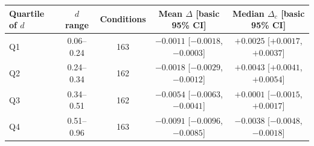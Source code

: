 \begin{tabular}{lcccc}
\toprule
Quartile of $d$ & $d$ range & Conditions & Mean $\Delta$ [basic 95\% CI] & Median $\Delta_c$ [basic 95\% CI] \\
\midrule
Q1 & 0.06--0.24 & 163 & $-0.0011$ [$-0.0018$, $-0.0003$] & $+0.0025$ [$+0.0017$, $+0.0037$] \\
Q2 & 0.24--0.34 & 162 & $-0.0018$ [$-0.0029$, $-0.0012$] & $+0.0043$ [$+0.0041$, $+0.0054$] \\
Q3 & 0.34--0.51 & 162 & $-0.0054$ [$-0.0063$, $-0.0041$] & $+0.0001$ [$-0.0015$, $+0.0017$] \\
Q4 & 0.51--0.96 & 163 & $-0.0091$ [$-0.0096$, $-0.0085$] & $-0.0038$ [$-0.0048$, $-0.0018$] \\
\bottomrule
\end{tabular}
